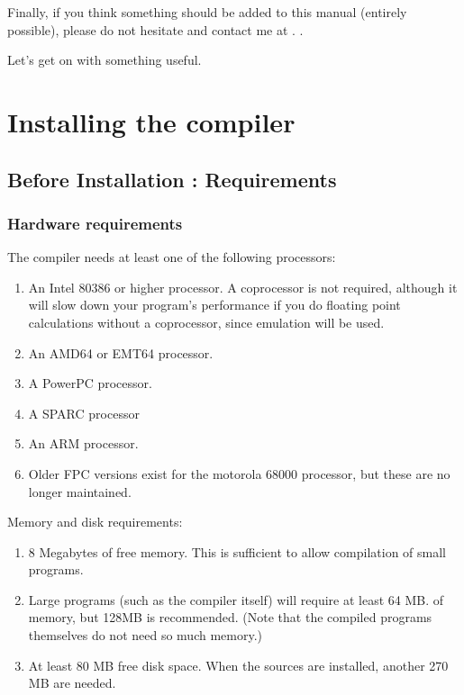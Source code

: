 Finally, if you think something should be added to this manual
(entirely possible), please do not hesitate and contact me at
.
.

Let's get on with something useful.


\chapter{Installing the compiler}
\label{ch:Installation}

\section{Before Installation : Requirements}

%
%
\subsection{Hardware requirements}
The compiler needs at least one of the following processors:
\begin{enumerate}
\item An Intel 80386 or higher processor. A coprocessor 
is not required, although it will slow down your program's performance if you do 
floating point calculations without a coprocessor, since emulation will be used.
\item An AMD64 or EMT64 processor. 
\item A PowerPC processor. 
\item A SPARC processor
\item An ARM processor.
\item Older FPC versions exist for the motorola 68000 processor, 
but these are no longer maintained.
\end{enumerate}


Memory and disk requirements:
\begin{enumerate}
\item 8 Megabytes of free memory. This is sufficient to allow compilation of small programs. 
\item Large programs (such as the compiler itself) will require at least 64 MB. 
of memory, but 128MB is recommended. 
(Note that the compiled programs themselves do not need so much memory.)
\item At least 80 MB free disk space. 
When the sources are installed, another 270 MB are needed.
\end{enumerate}

